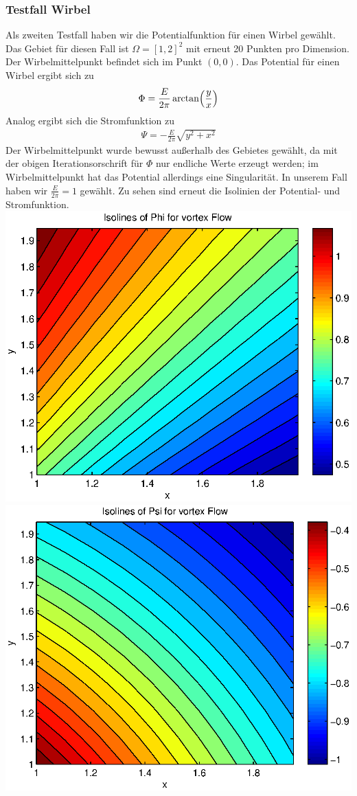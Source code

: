 \documentclass{article}
\begin{document}
\subsubsection{Testfall Wirbel}
Als zweiten Testfall haben wir die Potentialfunktion für einen Wirbel gewählt.
Das Gebiet für diesen Fall ist $\Omega =[1,2]^2$ mit erneut 20 Punkten pro Dimension. 
Der Wirbelmittelpunkt befindet sich im Punkt
$(0,0)$. Das Potential für einen Wirbel ergibt sich zu
\begin{align}
\Phi = \frac{E}{2\pi}\arctan\Bigl(\frac{y}{x}\Bigr)
\end{align}
Analog ergibt sich die Stromfunktion zu
\begin{align}
\Psi = -\frac{E}{2\pi}\sqrt{{y}^2+{x}^2}
\end{align}
Der Wirbelmittelpunkt wurde bewusst außerhalb des Gebietes gewählt, da 
mit der obigen Iterationsorschrift für $\Phi$ nur endliche Werte erzeugt werden;
im Wirbelmittelpunkt hat das Potential allerdings eine Singularität. In unserem Fall
haben wir $\frac{E}{2\pi}=1$ gewählt.
Zu sehen sind erneut die Isolinien der Potential- und Stromfunktion.\newpage
\includegraphics[scale=0.4]{test/2vortex/phi.eps}
\includegraphics[scale=0.4]{test/2vortex/psi.eps}\\
\end{document}
